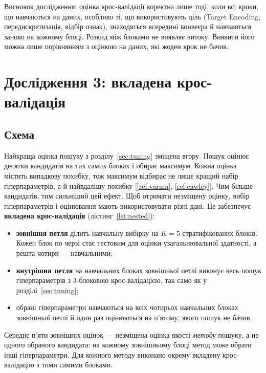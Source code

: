 \documentclass[14pt,a4paper]{extreport}
\begin{document}
Висновок дослідження: оцінка крос-валідації коректна лише тоді, коли всі кроки, що навчаються на даних, особливо ті, що використовують ціль (Target Encoding, передискретизація, відбір ознак), знаходяться всередині конвеєра й навчаються заново на кожному блоці. Розкид між блоками не виявляє витоку. Виявити його можна лише порівнянням з оцінкою на даних, які жоден крок не бачив.

\section{Дослідження 3: вкладена крос-валідація}
\label{sec:nested}

\subsection{Схема}

Найкраща оцінка пошуку з розділу~\ref{sec:tuning} зміщена вгору. Пошук оцінює десятки кандидатів на тих самих блоках і обирає максимум. Кожна оцінка містить випадкову похибку, тож максимум відбирає не лише кращий набір гіперпараметрів, а й найвдалішу похибку [\ref{ref:varma}, \ref{ref:cawley}]. Чим більше кандидатів, тим сильніший цей ефект. Щоб отримати незміщену оцінку, вибір гіперпараметрів і оцінювання мають використовувати різні дані. Це забезпечує \textbf{вкладена крос-валідація} (лістинг~\ref{lst:nested}):

\begin{itemize}
\item \textbf{зовнішня петля} ділить навчальну вибірку на $K = 5$ стратифікованих блоків. Кожен блок по черзі стає тестовим для оцінки узагальнювальної здатності, а решта чотири --- навчальними;
\item \textbf{внутрішня петля} на навчальних блоках зовнішньої петлі виконує весь пошук гіперпараметрів з 3-блоковою крос-валідацією, так само як у розділі~\ref{sec:tuning};
\item обрані гіперпараметри навчаються на всіх чотирьох навчальних блоках зовнішньої петлі й один раз оцінюються на п'ятому, якого пошук не бачив.
\end{itemize}

Середнє п'яти зовнішніх оцінок --- незміщена оцінка якості \emph{методу} пошуку, а не одного обраного кандидата: на кожному зовнішньому блоці метод може обрати інші гіперпараметри. Для кожного методу виконано окрему вкладену крос-валідацію з тими самими блоками.

\inputminted[firstline=92,lastline=108]{python}{../src/mk1/nested.py}
\label{lst:nested}
\end{document}
